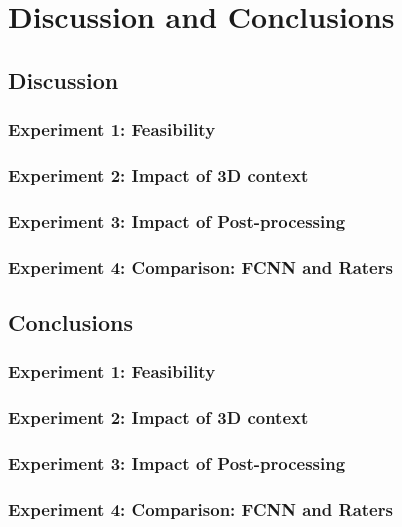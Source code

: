 \chapter{Discussion and Conclusions}

\section{Discussion}
\subsection{Experiment 1: Feasibility}
\subsection{Experiment 2: Impact of 3D context}
\subsection{Experiment 3: Impact of Post-processing}
\subsection{Experiment 4: Comparison: FCNN and Raters}
\section{Conclusions}
\subsection{Experiment 1: Feasibility}
\subsection{Experiment 2: Impact of 3D context}
\subsection{Experiment 3: Impact of Post-processing}
\subsection{Experiment 4: Comparison: FCNN and Raters}

\endinput